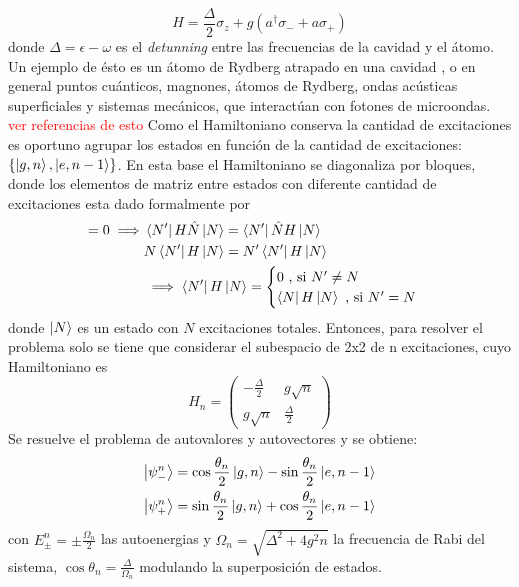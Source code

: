 \begin{equation}\label{eq3:hamiltoniano jcm}
    H=\frac{\Delta}{2}\sigma_z+g(a^\dagger \sigma_-+a \sigma_+)
\end{equation}
donde $\Delta = \epsilon - \omega$ es el \textit{detunning} entre las frecuencias de la cavidad y el átomo. Un ejemplo de ésto es un átomo de Rydberg atrapado en una cavidad \cite{Haroche2006}, o en general puntos cuánticos, magnones, átomos de Rydberg, ondas acústicas superficiales y sistemas mecánicos, que interactúan con fotones de microondas. \textcolor{red}{ver referencias de esto}
Como el Hamiltoniano conserva la cantidad de excitaciones es oportuno agrupar los estados en funci\'on de la cantidad de excitaciones: $\{\ket{g,n},\ket{e,n-1}\}$. En esta base el Hamiltoniano se diagonaliza por bloques, donde los elementos de matriz entre estados con diferente cantidad de excitaciones esta dado formalmente por
\begin{align*}
    [H,\hat N]=0 \implies & \bra{N'}H \hat N \ket{N} = \bra{N'}\hat N H \ket{N} \\
    & N \bra{N'}H  \ket{N} = N' \bra{N'}H \ket{N} \\
    & \implies \bra{N'}H \ket{N} = \begin{cases}
        0 \text{ , si } N' \neq N \\
        \bra{N}H \ket{N} \text{ , si } N'=N
    \end{cases}
\end{align*}
donde $\ket{N}$ es un estado con $N$ excitaciones totales. Entonces, para resolver el problema solo se tiene que considerar el subespacio de 2x2 de n excitaciones, cuyo Hamiltoniano es
\begin{equation}
    H_n=\begin{pmatrix}
        -\frac{\Delta}{2} & g \sqrt{n} \\
        g \sqrt{n} & \frac{\Delta}{2} 
    \end{pmatrix}
\end{equation}
Se resuelve el problema de autovalores y autovectores y se obtiene:
\begin{equation}
    \begin{aligned}
        \ket{\psi^n_-} & = \cos \frac{\theta_n}{2}\ket{g,n}-\sin \frac{\theta_n}{2}\ket{e,n-1} \\
        \ket{\psi^n_+} & = \sin \frac{\theta_n}{2}\ket{g,n}+\cos \frac{\theta_n}{2}\ket{e,n-1}        
    \end{aligned}
\end{equation}
con $E_{\pm}^n=\pm \frac{\Omega_n}{2}$ las autoenergias y $\Omega_n=\sqrt{\Delta^2+4g^2n}$ la frecuencia de Rabi del sistema, $\cos \theta_n=\frac{\Delta}{\Omega_n}$ modulando la superposici\'on de estados. 
